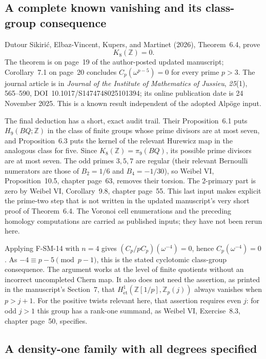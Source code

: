 \subsection{A complete known vanishing and its class-group consequence}

Dutour Sikiri\'c, Elbaz-Vincent, Kupers, and Martinet (2026),
Theorem~6.4, prove
\[
 K_8(\mathbb Z)=0.
\]
The theorem is on page~19 of the author-posted updated manuscript;
Corollary~7.1 on page~20 concludes
$C_p(\omega^{p-5})=0$ for every prime $p>3$.  The journal article is in
\emph{Journal of the Institute of Mathematics of Jussieu},
\emph{25}(1), 565--590, DOI~10.1017/S1474748025101394;
its online publication date is 24 November 2025.  This is a known result
independent of the adopted Alp\"oge input.

The final deduction has a short, exact audit trail.  Their
Proposition~6.1 puts $H_9(BQ;\mathbb Z)$ in the class of finite groups
whose prime divisors are at most seven, and Proposition~6.3 puts the
kernel of the relevant Hurewicz map in the analogous class for five.
Since $K_8(\mathbb Z)=\pi_9(BQ)$, its possible prime divisors are at
most seven.  The odd primes $3,5,7$ are regular (their relevant Bernoulli
numerators are those of $B_2=1/6$ and $B_4=-1/30$), so Weibel VI,
Proposition~10.5, chapter page~63, removes their torsion.  The
$2$-primary part is zero by Weibel VI, Corollary~9.8, chapter page~55.
This last input makes explicit the prime-two step that is not written in
the updated manuscript's very short proof of Theorem~6.4.  The Voronoi
cell enumerations and the preceding homology computations are carried
as published inputs; they have not been rerun here.

Applying F-SM-14 with $n=4$ gives
$(C_p/pC_p)(\omega^{-4})=0$, hence
$C_p(\omega^{-4})=0$.  As $-4\equiv p-5\pmod{p-1}$, this is the stated
cyclotomic class-group consequence.  The argument works at the level of
finite quotients without an incorrect uncompleted Chern map.  It also
does not need the assertion, as printed in the manuscript's Section~7,
that $H^1_{\mathrm{\acute et}}(\mathbb Z[1/p],\mathbb Z_p(j))$
always vanishes when $p>j+1$.  For the positive twists relevant here,
that assertion requires even $j$: for odd $j>1$ this group has a
rank-one summand, as
Weibel VI, Exercise~8.3, chapter page~50, specifies.

\subsection{A density-one family with all degrees specified}

